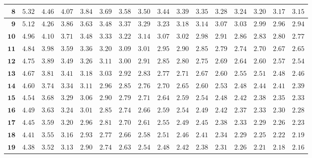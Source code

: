 \begin{longtable}{|r|r|r|r|r|r|r|r|r|r|r|r|r|r|r|r|}
    \(\mathbf{8}\) & \(5.32\) & \(4.46\) & \(4.07\) & \(3.84\) & \(3.69\) & \(3.58\) & \(3.50\) & \(3.44\) & \(3.39\) & \(3.35\) & \(3.28\) & \(3.24\) & \(3.20\) & \(3.17\) & \(3.15\) \\ \hline
    \(\mathbf{9}\) & \(5.12\) & \(4.26\) & \(3.86\) & \(3.63\) & \(3.48\) & \(3.37\) & \(3.29\) & \(3.23\) & \(3.18\) & \(3.14\) & \(3.07\) & \(3.03\) & \(2.99\) & \(2.96\) & \(2.94\) \\ \hline
    \(\mathbf{10}\) & \(4.96\) & \(4.10\) & \(3.71\) & \(3.48\) & \(3.33\) & \(3.22\) & \(3.14\) & \(3.07\) & \(3.02\) & \(2.98\) & \(2.91\) & \(2.86\) & \(2.83\) & \(2.80\) & \(2.77\) \\ \hline
    \(\mathbf{11}\) & \(4.84\) & \(3.98\) & \(3.59\) & \(3.36\) & \(3.20\) & \(3.09\) & \(3.01\) & \(2.95\) & \(2.90\) & \(2.85\) & \(2.79\) & \(2.74\) & \(2.70\) & \(2.67\) & \(2.65\) \\ \hline
    \(\mathbf{12}\) & \(4.75\) & \(3.89\) & \(3.49\) & \(3.26\) & \(3.11\) & \(3.00\) & \(2.91\) & \(2.85\) & \(2.80\) & \(2.75\) & \(2.69\) & \(2.64\) & \(2.60\) & \(2.57\) & \(2.54\) \\ \hline
    \(\mathbf{13}\) & \(4.67\) & \(3.81\) & \(3.41\) & \(3.18\) & \(3.03\) & \(2.92\) & \(2.83\) & \(2.77\) & \(2.71\) & \(2.67\) & \(2.60\) & \(2.55\) & \(2.51\) & \(2.48\) & \(2.46\) \\ \hline
    \(\mathbf{14}\) & \(4.60\) & \(3.74\) & \(3.34\) & \(3.11\) & \(2.96\) & \(2.85\) & \(2.76\) & \(2.70\) & \(2.65\) & \(2.60\) & \(2.53\) & \(2.48\) & \(2.44\) & \(2.41\) & \(2.39\) \\ \hline
    \(\mathbf{15}\) & \(4.54\) & \(3.68\) & \(3.29\) & \(3.06\) & \(2.90\) & \(2.79\) & \(2.71\) & \(2.64\) & \(2.59\) & \(2.54\) & \(2.48\) & \(2.42\) & \(2.38\) & \(2.35\) & \(2.33\) \\ \hline
    \(\mathbf{16}\) & \(4.49\) & \(3.63\) & \(3.24\) & \(3.01\) & \(2.85\) & \(2.74\) & \(2.66\) & \(2.59\) & \(2.54\) & \(2.49\) & \(2.42\) & \(2.37\) & \(2.33\) & \(2.30\) & \(2.28\) \\ \hline
    \(\mathbf{17}\) & \(4.45\) & \(3.59\) & \(3.20\) & \(2.96\) & \(2.81\) & \(2.70\) & \(2.61\) & \(2.55\) & \(2.49\) & \(2.45\) & \(2.38\) & \(2.33\) & \(2.29\) & \(2.26\) & \(2.23\) \\ \hline
    \(\mathbf{18}\) & \(4.41\) & \(3.55\) & \(3.16\) & \(2.93\) & \(2.77\) & \(2.66\) & \(2.58\) & \(2.51\) & \(2.46\) & \(2.41\) & \(2.34\) & \(2.29\) & \(2.25\) & \(2.22\) & \(2.19\) \\ \hline
    \(\mathbf{19}\) & \(4.38\) & \(3.52\) & \(3.13\) & \(2.90\) & \(2.74\) & \(2.63\) & \(2.54\) & \(2.48\) & \(2.42\) & \(2.38\) & \(2.31\) & \(2.26\) & \(2.21\) & \(2.18\) & \(2.16\) \\ \hline

\end{longtable}
